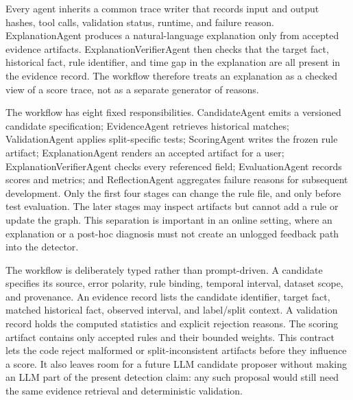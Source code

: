 Every agent inherits a common trace writer that records input and output hashes, tool calls, validation status, runtime, and failure reason. ExplanationAgent produces a natural-language explanation only from accepted evidence artifacts. ExplanationVerifierAgent then checks that the target fact, historical fact, rule identifier, and time gap in the explanation are all present in the evidence record. The workflow therefore treats an explanation as a checked view of a score trace, not as a separate generator of reasons.

The workflow has eight fixed responsibilities. CandidateAgent emits a versioned candidate specification; EvidenceAgent retrieves historical matches; ValidationAgent applies split-specific tests; ScoringAgent writes the frozen rule artifact; ExplanationAgent renders an accepted artifact for a user; ExplanationVerifierAgent checks every referenced field; EvaluationAgent records scores and metrics; and ReflectionAgent aggregates failure reasons for subsequent development. Only the first four stages can change the rule file, and only before test evaluation. The later stages may inspect artifacts but cannot add a rule or update the graph. This separation is important in an online setting, where an explanation or a post-hoc diagnosis must not create an unlogged feedback path into the detector.

The workflow is deliberately typed rather than prompt-driven. A candidate specifies its source, error polarity, rule binding, temporal interval, dataset scope, and provenance. An evidence record lists the candidate identifier, target fact, matched historical fact, observed interval, and label/split context. A validation record holds the computed statistics and explicit rejection reasons. The scoring artifact contains only accepted rules and their bounded weights. This contract lets the code reject malformed or split-inconsistent artifacts before they influence a score. It also leaves room for a future LLM candidate proposer without making an LLM part of the present detection claim: any such proposal would still need the same evidence retrieval and deterministic validation.

